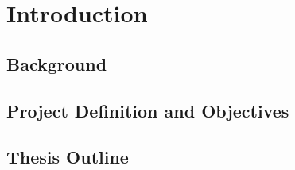 \graphicspath{{introduction/fig/}}

\chapter{Introduction}
\label{chap:introduction}

\section{Background}
\section{Project Definition and Objectives}
\section{Thesis Outline}



